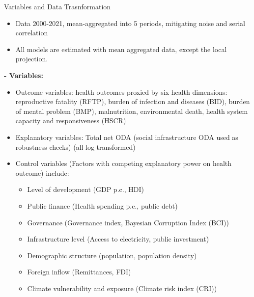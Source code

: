 \documentclass[aspectratio=169,handout, 10pt]{beamer}
\begin{document}
\begin{frame}{Variables and Data Trasnformation}
\begin{itemize}
  \item Data 2000-2021, mean-aggregated into 5 periods, mitigating noise and serial correlation
  \item All models are estimated with mean aggregated data, except the local projection. 
\end{itemize} 
\textbf{- Variables:}
\begin{itemize}
    \item Outcome variables: health outcomes proxied by six health dimensions: reproductive fatality (RFTP), burden of infection and diseases (BID), burden of mental problem (BMP), malnutrition, environmental death, health system capacity and responsiveness (HSCR)
    \item Explanatory variables: Total net ODA (social infrastructure ODA used as robustness checks) (all log-transformed)  
    \item Control variables (Factors with competing explanatory power on health outcome) include:
    \begin{itemize}
        \item Level of development (GDP p.c., HDI)
        \item Public finance (Health spending p.c., public debt)
        \item Governance (Governance index, Bayesian Corruption Index (BCI))
        \item Infrastructure level (Access to electricity, public investment)
        \item Demographic structure (population, population density)
        \item Foreign inflow (Remittances, FDI)
        \item Climate vulnerability and exposure (Climate risk index (CRI)) 
        \end{itemize}
\end{itemize}

\end{frame}


\end{document}
